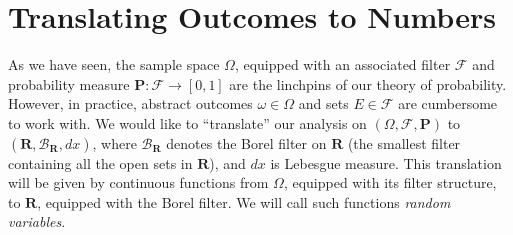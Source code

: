 \chapter{Translating Outcomes to Numbers}
As we have seen, the sample space $\Omega$, equipped with an associated filter
$\mathcal{F}$ and probability measure $\mathbf{P}: \mathcal{F} \to [0,1]$ 
are the linchpins of our theory of probability. However, in practice,
abstract outcomes $\omega \in \Omega$ and sets $E \in \mathcal{F}$ are
cumbersome to work with. We would like to ``translate'' our analysis
on $(\Omega, \mathcal{F}, \mathbf{P})$ to $(\mathbf{R}, \mathcal{B}_{\mathbf{R}}, dx)$,
where $\mathcal{B}_{\mathbf{R}}$ denotes the Borel filter on $\mathbf{R}$ (the smallest 
filter containing all the open sets in $\mathbf{R}$), and $dx$ is
Lebesgue measure. This translation will be given by continuous functions from
$\Omega$, equipped with its filter structure, to $\mathbf{R}$,
equipped with the Borel filter. We will call such functions 
\emph{random variables}.

